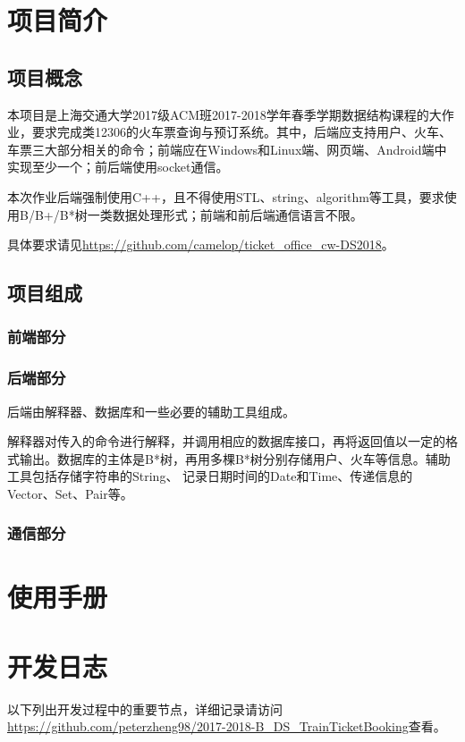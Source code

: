 \documentclass[12pt,a4paper,UTF8]{report}
\begin{document}
\chapter{项目简介}
\section{项目概念}
\par 本项目是上海交通大学2017级ACM班2017-2018学年春季学期数据结构课程的大作业，要求完成类12306的火车票查询与预订系统。其中，后端应支持用户、火车、车票三大部分相关的命令；前端应在Windows和Linux端、网页端、Android端中实现至少一个；前后端使用socket通信。
\par 本次作业后端强制使用C++，且不得使用STL、string、algorithm等工具，要求使用B/B+/B*树一类数据处理形式；前端和前后端通信语言不限。
\par 具体要求请见\color{blue}\url{https://github.com/camelop/ticket_office_cw-DS2018}\color{black}。
\section{项目组成}
\subsection{前端部分}
\subsection{后端部分}
\par 后端由解释器、数据库和一些必要的辅助工具组成。
\par 解释器对传入的命令进行解释，并调用相应的数据库接口，再将返回值以一定的格式输出。数据库的主体是B*树，再用多棵B*树分别存储用户、火车等信息。辅助工具包括存储字符串的String、 记录日期时间的Date和Time、传递信息的Vector、Set、Pair等。
\subsection{通信部分}
\newpage
\chapter{使用手册}
\newpage
\chapter{开发日志}
\par 以下列出开发过程中的重要节点，详细记录请访问\color{blue}\url{https://github.com/peterzheng98/2017-2018-B_DS_TrainTicketBooking}\color{black}查看。
\end{document}
